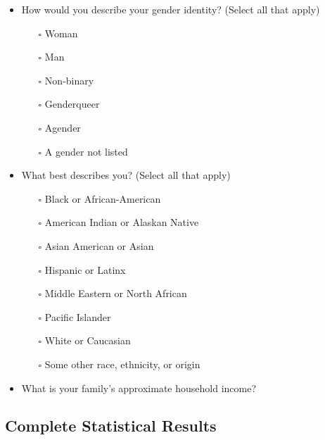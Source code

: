 \begin{itemize}
    \item How would you describe your gender identity? (Select all that apply)
        \begin{itemize}
            \item[$\square$] Woman
            \item[$\square$] Man
            \item[$\square$] Non-binary
            \item[$\square$] Genderqueer
            \item[$\square$] Agender
            \item[$\square$] A gender not listed
        \end{itemize}
    \item What best describes you? (Select all that apply)
        \begin{itemize}
            \item[$\square$] Black or African-American
            \item[$\square$] American Indian or Alaskan Native
            \item[$\square$] Asian American or Asian
            \item[$\square$] Hispanic or Latinx
            \item[$\square$] Middle Eastern or North African
            \item[$\square$] Pacific Islander
            \item[$\square$] White or Caucasian
            \item[$\square$] Some other race, ethnicity, or origin 
        \end{itemize}
    \item What is your family’s approximate household income? 
\end{itemize}

\clearpage 

\subsection{Complete Statistical Results}
\label{app:stats}

